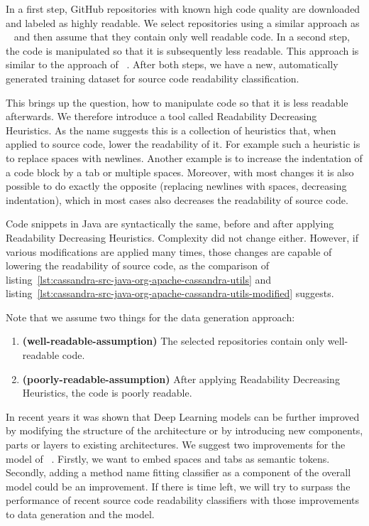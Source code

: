 \documentclass[%
class=scrreprt,
chapterprefix=false,%
open=right,%
twoside=false,%
paper=a4,%
logofile={Logo\_zentral\_farbig\_EN.png},%
thesistype=master,%
UKenglish,%
]{se2thesis}
\begin{document}
	In a first step, GitHub repositories with known high code quality are downloaded and labeled as highly readable. We select repositories using a similar approach as \citeauthor{allamanis2016convolutional}~\cite{allamanis2016convolutional} and then assume that they contain only well readable code.
	In a second step, the code is manipulated so that it is subsequently less readable. This approach is similar to the approach of \citeauthor{loriot2022styler}~\cite{loriot2022styler}. After both steps, we have a new, automatically generated training dataset for source code readability classification.
		
	This brings up the question, how to manipulate code so that it is less readable afterwards. We therefore introduce a tool called Readability Decreasing Heuristics. As the name suggests this is a collection of heuristics that, when applied to source code, lower the readability of it. For example such a heuristic is to replace spaces with newlines. Another example is to increase the indentation of a code block by a tab or multiple spaces. Moreover, with most changes it is also possible to do exactly the opposite (replacing newlines with spaces, decreasing indentation), which in most cases also decreases the readability of source code.
	
	Code snippets in Java are syntactically the same, before and after applying Readability Decreasing Heuristics. Complexity did not change either. However, if various modifications are applied many times, those changes are capable of lowering the readability of source code, as the comparison of listing~\ref{lst:cassandra-src-java-org-apache-cassandra-utils} and listing~\ref{lst:cassandra-src-java-org-apache-cassandra-utils-modified} suggests.
	
	Note that we assume two things for the data generation approach:
	\begin{enumerate}[label={Assumption \arabic*},ref={\arabic*},leftmargin=*]
		\item \label{well-readable-assumption} \textbf{(well-readable-assumption)} The selected repositories contain only well-readable code.
		\item \label{poorly-readable-assumption} \textbf{(poorly-readable-assumption)} After applying Readability Decreasing Heuristics, the code is poorly readable.
	\end{enumerate}
	
	\label{model-modifications}
	In recent years it was shown that Deep Learning models can be further improved by modifying the structure of the architecture or by introducing new components, parts or layers to existing architectures. 
	We suggest two improvements for the model of \citeauthor{mi2022towards}~\cite{mi2022towards}. Firstly, we want to embed spaces and tabs as semantic tokens. Secondly, adding a method name fitting classifier as a component of the overall model could be an improvement.
	\label{suggestions}If there is time left, we will try to surpass the performance of recent source code readability classifiers with those improvements to data generation and the model.
	
\end{document}
